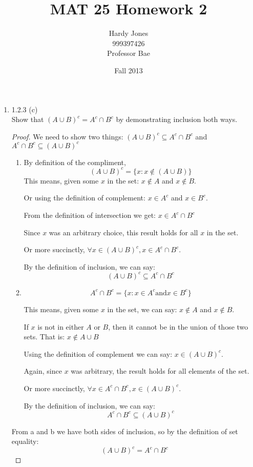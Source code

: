 \documentclass[12pt,letterpaper]{article}
\title{MAT 25 Homework 2\vspace{-2ex}}
\author{Hardy Jones\\
        999397426\\
        Professor Bae\vspace{-2ex}}
\date{Fall 2013}
\begin{document}
  \maketitle

  \begin{enumerate}
    \item 1.2.3 (c) \\
      Show that $(A \cup B)^c = A^c \cap B^c$
      by demonstrating inclusion both ways.

      \begin{proof}
        We need to show  two things:
        $(A \cup B)^c \subseteq A^c \cap B^c$
        and
        $A^c \cap B^c \subseteq (A \cup B)^c$

        \begin{enumerate}
          \item
            By definition of the compliment,
            \[(A \cup B)^c = \{x : x \notin (A \cup B)\}\]
            This means, given some $x$ in the set:
            $x \notin A$ and $x \notin B$.

            Or using the definition of complement:
            $x \in A^c$ and $x \in B^c$.

            From the definition of intersection we get:
            $x \in A^c \cap B^c$

            Since $x$ was an arbitrary choice,
            this result holds for all $x$ in the set.

            Or more succinctly,
            $\forall x \in (A \cup B)^c, x \in A^c \cap B^c$.

            By the definition of inclusion, we can say:
            \[(A \cup B)^c \subseteq A^c \cap B^c\]

          \item
            \[A^c \cap B^c = \{x : x \in A^c \text{and} x \in B^c\}\]

            This means, given some $x$ in the set, we can say:
            $x \notin A$ and $x \notin B$.

            If $x$ is not in either $A$ or $B$,
            then it cannot be in the union of those two sets.
            That is: $x \notin A \cup B$

            Using the definition of complement we can say:
            $x \in (A \cup B)^c$.

            Again, since $x$ was arbitrary,
            the result holds for all elements of the set.

            Or more succinctly,
            $\forall x \in A^c \cap B^c, x \in (A \cup B)^c$.

            By the definition of inclusion, we can say:
            \[A^c \cap B^c \subseteq (A \cup B)^c\]
        \end{enumerate}

        From a and b we have both sides of inclusion,
        so by the definition of set equality:
        \[(A \cup B)^c = A^c \cap B^c\]
      \end{proof}
  \end{enumerate}
\end{document}
